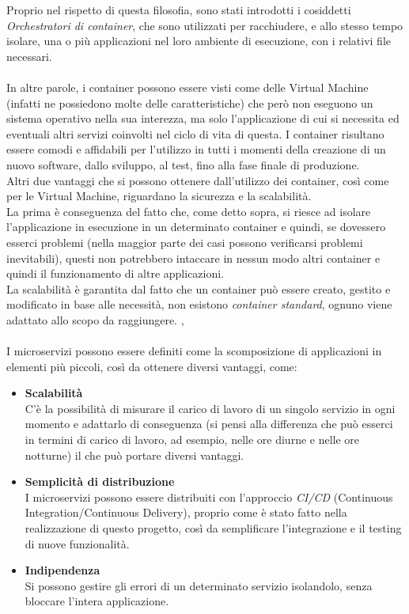 Proprio nel rispetto di questa filosofia, sono stati introdotti i cosiddetti \emph{Orchestratori di container}, che sono utilizzati per racchiudere, e allo stesso tempo 
isolare, una o più applicazioni nel loro ambiente di esecuzione, con i relativi file necessari.\\ \\
In altre parole, i container possono essere visti come delle Virtual Machine (infatti ne possiedono molte delle caratteristiche) che però non eseguono un sistema operativo 
nella sua interezza, ma solo l'applicazione di cui si necessita ed eventuali altri servizi coinvolti nel ciclo di vita di questa.
I container risultano essere comodi e affidabili per l'utilizzo in tutti i momenti della creazione di un nuovo software, dallo sviluppo, al test, 
fino alla fase finale di produzione.\\ Altri due vantaggi che si possono ottenere dall'utilizzo dei container, così come per le Virtual Machine, 
riguardano la sicurezza e la scalabilità.\\
La prima è conseguenza del fatto che, come detto sopra, si riesce ad isolare l'applicazione in esecuzione in un determinato container e quindi, se dovessero esserci 
problemi (nella maggior parte dei casi possono verificarsi problemi inevitabili), questi non potrebbero intaccare in nessun modo altri container e quindi il funzionamento 
di altre applicazioni.\\
La scalabilità è garantita dal fatto che un container può essere creato, gestito e modificato in base alle necessità, non esistono \emph{container standard}, ognuno 
viene adattato allo scopo da raggiungere. \cite{RedHatMicroservices}, \cite{Amazon} \\ \\

I microservizi possono essere definiti come la scomposizione di applicazioni in elementi più piccoli, così da ottenere diversi vantaggi, come:
\begin{itemize}
\item \textbf{Scalabilità}\\ C'è la possibilità di misurare il carico di lavoro di un singolo servizio in ogni momento e adattarlo di conseguenza (si pensi alla differenza 
che può esserci in termini di carico di lavoro, ad esempio, nelle ore diurne e nelle ore notturne) il che può portare diversi vantaggi.
\item \textbf{Semplicità di distribuzione}\\ I microservizi possono essere distribuiti con l'approccio \emph{CI/CD} (Continuous Integration/Continuous Delivery), 
proprio come è stato fatto nella realizzazione di questo progetto, così da semplificare l'integrazione e il testing di nuove funzionalità.
\item \textbf{Indipendenza}\\ Si possono gestire gli errori di un determinato servizio isolandolo, senza bloccare l'intera applicazione.
\end{itemize}

